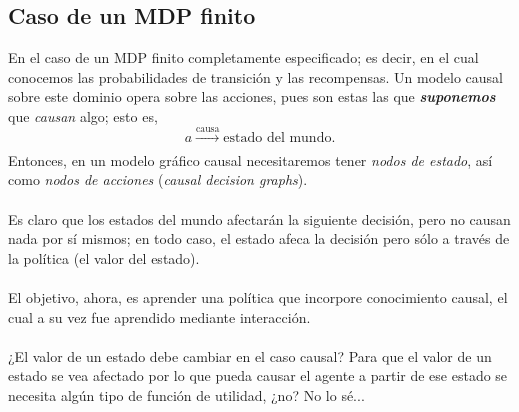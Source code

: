 \documentclass[11pt]{article}
\theoremstyle{plain}
\begin{document}
\subsection{Caso de un MDP finito}
En el caso de un MDP finito completamente especificado; es decir, en el cual conocemos las probabilidades de transición y las recompensas. Un modelo causal sobre este dominio opera sobre las acciones, pues son estas las que \textbf{\textit{suponemos}} que \textit{causan} algo; esto es, 
\[ a \xrightarrow[]{\text{causa}} \textrm{estado del mundo}. \]
Entonces, en un modelo gráfico causal necesitaremos tener \textit{nodos de estado}, así como \textit{nodos de acciones} (\textit{causal decision graphs}).\\
\\
Es claro que los estados del mundo afectarán la siguiente decisión, pero no causan nada por sí mismos; en todo caso, el estado afeca la decisión pero sólo a través de la política (el valor del estado).\\
\\
El objetivo, ahora, es aprender una política que incorpore conocimiento causal, el cual a su vez fue aprendido mediante interacción.\\
\\
¿El valor de un estado debe cambiar en el caso causal? Para que el valor de un estado se vea afectado por lo que pueda causar el agente a partir de ese estado se necesita algún tipo de función de utilidad, ¿no? No lo sé...
\newpage


\end{document}
